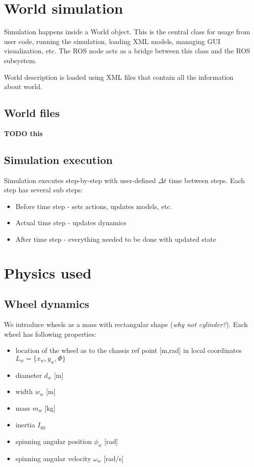 \documentclass[a4paper,11pt]{article}
\begin{document}
\newpage

\section{World simulation}
Simulation happens inside a World object.
This is the central class for usage from user code, running the simulation, loading XML models, managing GUI visualization, etc.
The ROS node acts as a bridge between this class and the ROS subsystem.

World description is loaded using XML files that contain all the information about world.

\subsection{World files}
\textbf{TODO this}
\newpage


\subsection{Simulation execution}
Simulation executes step-by-step with user-defined $\Delta t$ time between steps.
Each step has several sub steps:
\begin{itemize}
\item Before time step - sets actions, updates models, etc.
\item Actual time step - updates dynamics
\item After time step - everything needed to be done with updated state
\end{itemize}
\newpage

\section{Physics used}
\subsection{Wheel dynamics}

We introduce wheels as a mass with rectangular shape (\textsl{why not cylinder?}).
Each wheel has following properties:
\begin{itemize}
\item location of the wheel as to the chassis ref point [m,rad] in local coordinates $L_w = \{ x_w, y_w, \Phi \}$
\item diameter $d_w$ [m]
\item width $w_w$ [m]
\item mass $m_w$ [kg]
\item inertia $I_{yy}$ 
\item spinning angular position $\phi_w$ [rad]
\item spinning angular velocity $\omega_w$ [rad/s]
\end{itemize}
\end{document}
